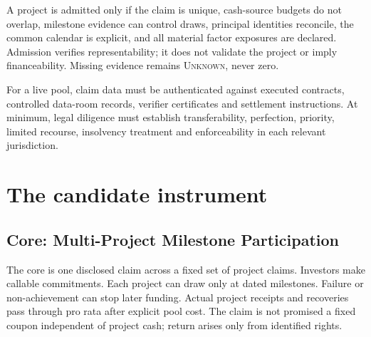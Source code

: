 \documentclass[11pt,a4paper]{article}
\newcommand{\statusunknown}{\textcolor{Alert}{\textsc{Unknown}}}
\begin{document}
A project is admitted only if the claim is unique, cash-source budgets do not overlap, milestone evidence can control draws, principal identities reconcile, the common calendar is explicit, and all material factor exposures are declared. Admission verifies representability; it does not validate the project or imply financeability. Missing evidence remains \statusunknown{}, never zero.

For a live pool, claim data must be authenticated against executed contracts, controlled data-room records, verifier certificates and settlement instructions. At minimum, legal diligence must establish transferability, perfection, priority, limited recourse, insolvency treatment and enforceability in each relevant jurisdiction.

\section{The candidate instrument}

\subsection{Core: Multi-Project Milestone Participation}

The core is one disclosed claim across a fixed set of project claims. Investors make callable commitments. Each project can draw only at dated milestones. Failure or non-achievement can stop later funding. Actual project receipts and recoveries pass through pro rata after explicit pool cost. The claim is not promised a fixed coupon independent of project cash; return arises only from identified rights.
\end{document}
